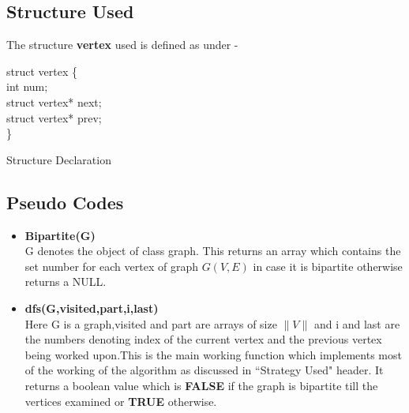 \documentclass[20pt]{article}
\begin{document}
\newcommand\mycommfont[1]{\small\ttfamily\textcolor{blue}{#1}}

\subsection{Structure Used}

The structure \textbf{vertex} used is defined as under -
\begin{algorithm}

	struct vertex \{ \\
		\hspace{1cm} int num; \\
		\hspace{1cm} struct vertex* next; \\
		\hspace{1cm} struct vertex* prev; \\
	\}

	\caption{Structure Declaration}

\end{algorithm}

\subsection{Pseudo Codes}

\begin{itemize}
\item \textbf{Bipartite(G)} \\
G denotes the object of class graph. This returns an array which contains the set number for each vertex of graph $G(V,E)$ in case it is bipartite otherwise returns a NULL.
\item \textbf{dfs(G,visited,part,i,last)} \\
Here G is a graph,visited and part are arrays of size $\|V\|$ and i and last are the numbers denoting index of the current vertex and the previous vertex being worked upon.This is the main working function which implements most of the working of the algorithm as discussed in ``Strategy Used" header. It returns a boolean value which is \textbf{FALSE} if the graph is bipartite till the vertices examined or \textbf{TRUE} otherwise.
\end{itemize}
\end{document}
